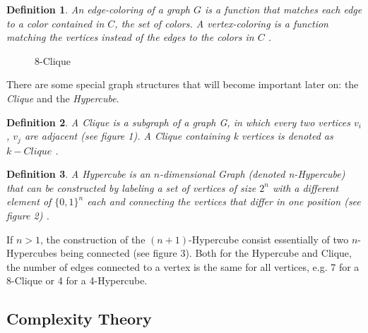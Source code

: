 \documentclass[12pt,a4paper]{article}
\newtheorem{definition}{Definition}
\begin{document}
\begin{definition}
An edge-coloring of a graph $G$ is a function that matches each edge to a color contained in $C$, the set of colors.  A vertex-coloring is a function matching the vertices instead of the edges to the colors in $C$ \citep[pp. 7-8]{Gross2013}.
\end{definition} 
\newpage
\begin{wrapfigure}{r}{4cm}
	
	\caption{8-Clique}
\end{wrapfigure}
\par There are some special graph structures that will become important later on: the \textit{Clique} and the \textit{Hypercube}. 
\begin{definition}
A Clique is a subgraph of a graph G, in which every two vertices $v_i$, $v_j$ are adjacent (see figure 1).  A Clique containing k vertices is denoted as $k-Clique$ \citep[pp. 21, 111]{Gross2013}.
\end{definition}
\begin{definition}
A Hypercube is an $n$-dimensional Graph (denoted n-Hypercube) that can be constructed by labeling a set of vertices of size $2^n$ with a different element of $\{ 0, 1 \}^n$ each and connecting the vertices that differ in one position (see figure 2) \citep[p. 60]{Bollobas1998}.
\end{definition}
If $n > 1$, the construction of the $(n+1)$-Hypercube consist essentially of two $n$-Hypercubes being connected (see figure 3). Both for the Hypercube and Clique, the number of edges connected to a vertex is the same for all vertices, e.g. 7 for a 8-Clique or 4 for a 4-Hypercube.
\newline

\par
\begin{figure}[h]
\begin{minipage}{.3\textwidth}
	
\end{minipage}
\begin{minipage}{.5\textwidth}
	
	\centering
	 	
\end{minipage}
\end{figure}

\newpage
\subsection{Complexity Theory}
\end{document}

